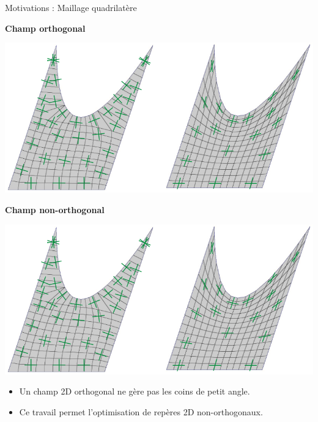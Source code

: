 \begin{frame}{Motivations : Maillage quadrilatère}
    \centering
    
    \begin{minipage}[c]{0.48\textwidth}
    \centering 
    \textbf{Champ orthogonal}\\
    \vspace{0.3cm}
    \begin{adjustbox}{width=0.8\linewidth,clip,trim=0 0 {.48\width} 0}
        \includegraphics{img_spm_ff/comp1.png}
    \end{adjustbox}
    \end{minipage}%
    \hfill\vline\hfill
    \begin{minipage}[c]{0.48\textwidth}
    \centering 
    \textbf{Champ non-orthogonal}\\
    \vspace{0.3cm}
    \begin{adjustbox}{width=0.75\linewidth,clip,trim={.52\width} 0 0 0}
        \includegraphics{img_spm_ff/comp1.png}
    \end{adjustbox}
    \end{minipage}
    
    \vspace*{0.3cm}
    \begin{itemize}
         \item Un champ 2D orthogonal ne gère pas les coins de petit angle.
         \item Ce travail permet l'optimisation de repères 2D non-orthogonaux.
    \end{itemize}
    
\end{frame}

